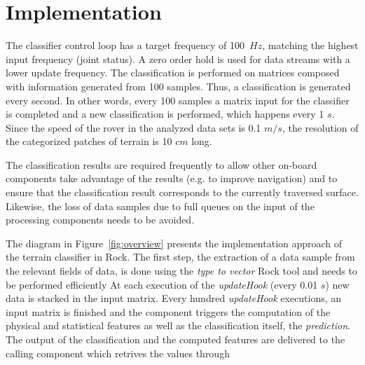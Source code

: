 
\section{Implementation}

The classifier control loop has a target frequency of 100~$\mathit{Hz}$, matching the highest input frequency (joint status). 
A zero order hold is used for data streams with a lower update frequency. 
The classification is performed on matrices composed with information generated from 100 samples. 
Thus, a classification is generated every second.
In other words, every 100 samples a matrix input for the classifier is completed and a new classification is performed, which happens every 1 $s$.
Since the speed of the rover in the analyzed data sets is 0.1 $m/s$, the resolution of the categorized patches of terrain is 10 $cm$ long.  

The classification results are required frequently to allow other on-board components take advantage of the results (e.g. to improve navigation) and to ensure that the classification result corresponds to the currently traversed surface. 
Likewise, the loss of data samples due to full queues on the input of the processing components needs to be avoided. 

The diagram in Figure~\ref{fig:overview} presents the implementation approach of the terrain classifier in Rock. 
The first step, the extraction of a data sample from the relevant fields of data, is done using the \emph{type to vector} Rock tool and needs to be performed efficiently 
At each execution of the \emph{updateHook} (every 0.01 $s$) new data is stacked in the input matrix.
Every hundred \emph{updateHook} executions, an input matrix is finished and the component triggers the computation of the physical and statistical features as well as the classification itself, the \emph{prediction}.
The output of the classification and the computed features are delivered to the calling component which retrives the values through 

